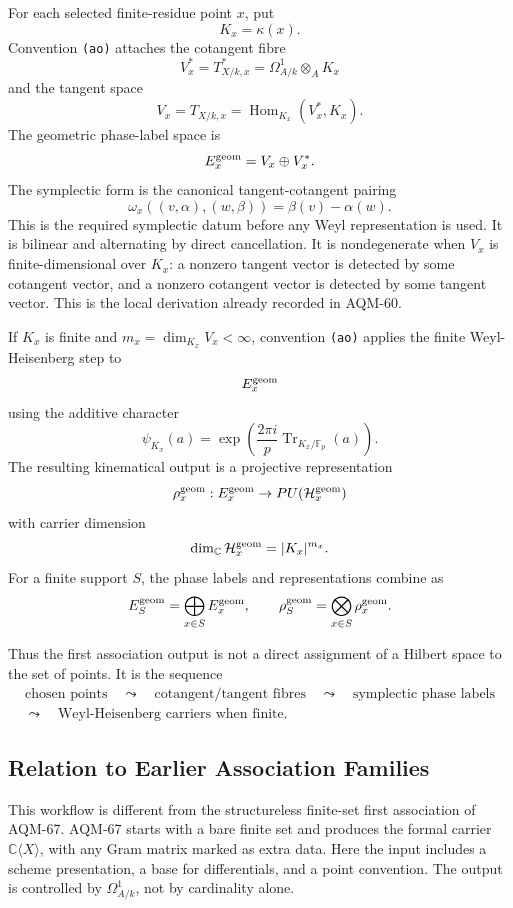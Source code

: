 For each selected finite-residue point \(x\), put
\[
  K_x=\kappa(x).
\]
Convention \texttt{(ao)} attaches the cotangent fibre
\[
  V_x^*=T^*_{X/k,x}=\Omega^1_{A/k}\otimes_A K_x
\]
and the tangent space
\[
  V_x=T_{X/k,x}=\operatorname{Hom}_{K_x}(V_x^*,K_x).
\]
The geometric phase-label space is
\[
  E_x^{\rm geom}=V_x\oplus V_x^*.
\]
The symplectic form is the canonical tangent-cotangent pairing
\[
  \omega_x((v,\alpha),(w,\beta))=\beta(v)-\alpha(w).
\]
This is the required symplectic datum before any Weyl representation is used.
It is bilinear and alternating by direct cancellation.  It is nondegenerate
when \(V_x\) is finite-dimensional over \(K_x\): a nonzero tangent vector is
detected by some cotangent vector, and a nonzero cotangent vector is detected
by some tangent vector.  This is the local derivation already recorded in
AQM-60.

If \(K_x\) is finite and \(m_x=\dim_{K_x}V_x<\infty\), convention
\texttt{(ao)} applies the finite Weyl-Heisenberg step to
\[
  E_x^{\rm geom}
\]
using the additive character
\[
  \psi_{K_x}(a)=
  \exp\!\left(\frac{2\pi i}{p}\operatorname{Tr}_{K_x/\mathbb F_p}(a)\right).
\]
The resulting kinematical output is a projective representation
\[
  \rho_x^{\rm geom}:E_x^{\rm geom}\to PU(\mathcal H_x^{\rm geom})
\]
with carrier dimension
\[
  \dim_{\mathbb C}\mathcal H_x^{\rm geom}=|K_x|^{m_x}.
\]
For a finite support \(S\), the phase labels and representations combine as
\[
  E_S^{\rm geom}=\bigoplus_{x\in S}E_x^{\rm geom},\qquad
  \rho_S^{\rm geom}=\bigotimes_{x\in S}\rho_x^{\rm geom}.
\]

Thus the first association output is not a direct assignment of a Hilbert
space to the set of points.  It is the sequence
\[
  \begin{gathered}
  \text{chosen points}\quad\leadsto\quad
  \text{cotangent/tangent fibres}\quad\leadsto\quad
  \text{symplectic phase labels}\\
  \leadsto\quad
  \text{Weyl-Heisenberg carriers when finite}.
  \end{gathered}
\]

\subsection{Relation to Earlier Association Families}

This workflow is different from the structureless finite-set first
association of AQM-67.  AQM-67 starts with a bare finite set and produces the
formal carrier \(\mathbb C\langle X\rangle\), with any Gram matrix marked as
extra data.  Here the input includes a scheme presentation, a base for
differentials, and a point convention.  The output is controlled by
\(\Omega^1_{A/k}\), not by cardinality alone.

